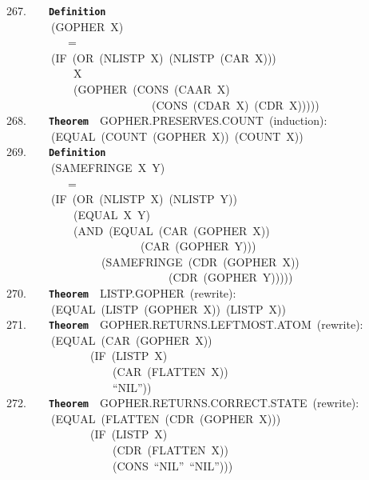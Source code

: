 \documentclass[11pt]{book}
\newenvironment{pubasis}{\begin{flushleft}\ttfamily\small}{\normalsize\rmfamily\end{flushleft}}
\newcommand{\axiomordefinition}[1]{\vspace{6pt}\texttt{\textbf{#1}}}
\begin{document}
\begin{pubasis}
267.~~~~\axiomordefinition{Definition}\\
~~~~~~~~(GOPHER~X)\\
~~~~~~~~~~~=\\
~~~~~~~~(IF~(OR~(NLISTP~X)~(NLISTP~(CAR~X)))\\
~~~~~~~~~~~~X\\
~~~~~~~~~~~~(GOPHER~(CONS~(CAAR~X)\\
~~~~~~~~~~~~~~~~~~~~~~~~~~(CONS~(CDAR~X)~(CDR~X)))))\\

268.~~~~\axiomordefinition{Theorem}~~GOPHER.PRESERVES.COUNT~(induction):\\
~~~~~~~~(EQUAL~(COUNT~(GOPHER~X))~(COUNT~X))\\

269.~~~~\axiomordefinition{Definition}\\
~~~~~~~~(SAMEFRINGE~X~Y)\\
~~~~~~~~~~~=\\
~~~~~~~~(IF~(OR~(NLISTP~X)~(NLISTP~Y))\\
~~~~~~~~~~~~(EQUAL~X~Y)\\
~~~~~~~~~~~~(AND~(EQUAL~(CAR~(GOPHER~X))\\
~~~~~~~~~~~~~~~~~~~~~~~~(CAR~(GOPHER~Y)))\\
~~~~~~~~~~~~~~~~~(SAMEFRINGE~(CDR~(GOPHER~X))\\
~~~~~~~~~~~~~~~~~~~~~~~~~~~~~(CDR~(GOPHER~Y)))))\\

270.~~~~\axiomordefinition{Theorem}~~LISTP.GOPHER~(rewrite):\\
~~~~~~~~(EQUAL~(LISTP~(GOPHER~X))~(LISTP~X))\\

271.~~~~\axiomordefinition{Theorem}~~GOPHER.RETURNS.LEFTMOST.ATOM~(rewrite):\\
~~~~~~~~(EQUAL~(CAR~(GOPHER~X))\\
~~~~~~~~~~~~~~~(IF~(LISTP~X)\\
~~~~~~~~~~~~~~~~~~~(CAR~(FLATTEN~X))\\
~~~~~~~~~~~~~~~~~~~``NIL''))\\

272.~~~~\axiomordefinition{Theorem}~~GOPHER.RETURNS.CORRECT.STATE~(rewrite):\\
~~~~~~~~(EQUAL~(FLATTEN~(CDR~(GOPHER~X)))\\
~~~~~~~~~~~~~~~(IF~(LISTP~X)\\
~~~~~~~~~~~~~~~~~~~(CDR~(FLATTEN~X))\\
~~~~~~~~~~~~~~~~~~~(CONS~``NIL''~``NIL'')))\\


\end{pubasis}
\end{document}
